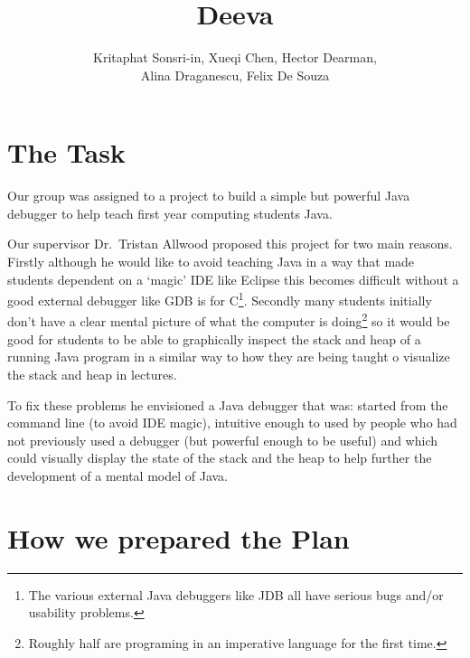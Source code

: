 \documentclass[11pt]{article}
\newcommand{\subtitle}[1]{%
  \posttitle{%
    \par\end{center}
    \begin{center}\large#1\end{center}
    \vskip0.5em}%
}
\begin{document}
\title{Deeva}
\subtitle{Planing Report}
\author{Kritaphat Sonsri-in, Xueqi Chen, Hector Dearman, \\Alina Draganescu, Felix De Souza}

\maketitle

\section{The Task}
Our group was assigned to a project to build a simple but powerful Java debugger to help teach first year computing students Java.

Our supervisor Dr.~Tristan Allwood proposed this project for two main reasons.
Firstly although he would like to avoid teaching Java in a way that made students dependent on a `magic' IDE like Eclipse this becomes difficult without a good external debugger like GDB is for C\footnote{The various external Java debuggers like JDB all have serious bugs and/or usability problems.}.
Secondly many students initially don't have a clear mental picture of what the computer is doing\footnote{Roughly half are programing in an imperative language for the first time.} so it would be good for students to be able to graphically inspect the stack and heap of a running Java program in a similar way to how they are being taught o visualize the stack and heap in lectures.

To fix these problems he envisioned a Java debugger that was: started from the command line (to avoid IDE magic), intuitive enough to used by people who had not previously used a debugger (but powerful enough to be useful) and which could visually display the state of the stack and the heap to help further the development of a mental model of Java.


\section{How we prepared the Plan}
\end{document}
